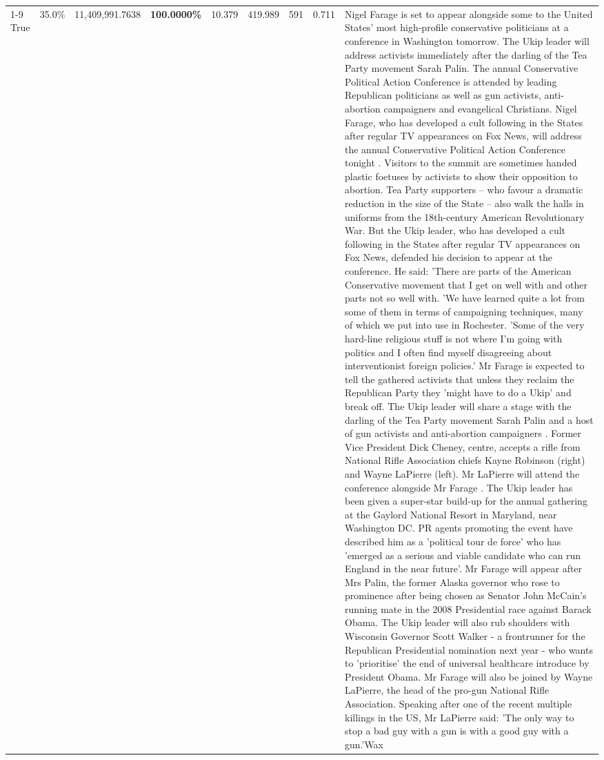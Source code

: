 \begin{table}[H]
\begin{tabular}{lllrlllll}
\cline{1-9}
True & 35.0\% & 11,409,991.7638 & \bfseries \color{red} 100.0000\% & 10.379 & 419.989 & 591 & 0.711 & Nigel Farage is set to appear alongside some to the United States' most high-profile conservative politicians at a conference in Washington tomorrow. The Ukip leader will address activists immediately after the darling of the Tea Party movement Sarah Palin. The annual Conservative Political Action Conference is attended by leading Republican politicians as well as gun activists, anti-abortion campaigners and evangelical Christians. Nigel Farage, who has developed a cult following in the States after regular TV appearances on Fox News, will address the annual Conservative Political Action Conference tonight . Visitors to the summit are sometimes handed plastic foetuses by activists to show their opposition to abortion. Tea Party supporters – who favour a dramatic reduction in the size of the State – also walk the halls in uniforms from the 18th-century American Revolutionary War. But the Ukip leader, who has developed a cult following in the States after regular TV appearances on Fox News, defended his decision to appear at the conference. He said: 'There are parts of the American Conservative movement that I get on well with and other parts not so well with. 'We have learned quite a lot from some of them in terms of campaigning techniques, many of which we put into use in Rochester. 'Some of the very hard-line religious stuff is not where I'm going with politics and I often find myself disagreeing about interventionist foreign policies.' Mr Farage is expected to tell the gathered activists that unless they reclaim the Republican Party they 'might have to do a Ukip' and break off. The Ukip leader will share a stage with the darling of the Tea Party movement Sarah Palin and a host of gun activists and anti-abortion campaigners . Former Vice President Dick Cheney, centre, accepts a rifle from National Rifle Association chiefs Kayne Robinson (right) and Wayne LaPierre (left). Mr LaPierre will attend the conference alongside Mr Farage . The Ukip leader has been given a super-star build-up for the annual gathering at the Gaylord National Resort in Maryland, near Washington DC. PR agents promoting the event have described him as a 'political tour de force' who has 'emerged as a serious and viable candidate who can run England in the near future'. Mr Farage will appear after Mrs Palin, the former Alaska governor who rose to prominence after being chosen as Senator John McCain's running mate in the 2008 Presidential race against Barack Obama. The Ukip leader will also rub shoulders with Wisconsin Governor Scott Walker - a frontrunner for the Republican Presidential nomination next year - who wants to 'prioritise' the end of universal healthcare introduce by President Obama. Mr Farage will also be joined by Wayne LaPierre, the head of the pro-gun National Rifle Association. Speaking after one of the recent multiple killings in the US, Mr LaPierre said: 'The only way to stop a bad guy with a gun is with a good guy with a gun.'Wax \\

\end{tabular}
\end{table}
